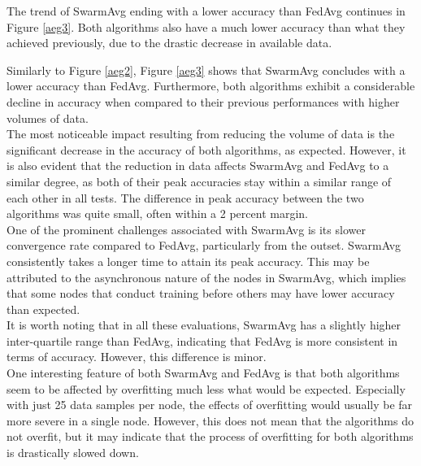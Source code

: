 The trend of SwarmAvg ending with a lower accuracy than FedAvg continues in Figure \ref{aeg3}. Both algorithms also have a much lower accuracy than what they achieved previously, due to the drastic decrease in available data.

Similarly to Figure \ref{aeg2}, Figure \ref{aeg3} shows that SwarmAvg concludes with a lower accuracy than FedAvg. Furthermore, both algorithms exhibit a considerable decline in accuracy when compared to their previous performances with higher volumes of data. \\


The most noticeable impact resulting from reducing the volume of data is the significant decrease in the accuracy of both algorithms, as expected. However, it is also evident that the reduction in data affects SwarmAvg and FedAvg to a similar degree, as both of their peak accuracies stay within a similar range of each other in all tests. The difference in peak accuracy between the two algorithms was quite small, often within a 2 percent margin. \\

One of the prominent challenges associated with SwarmAvg is its slower convergence rate compared to FedAvg, particularly from the outset. SwarmAvg consistently takes a longer time to attain its peak accuracy. This may be attributed to the asynchronous nature of the nodes in SwarmAvg, which implies that some nodes that conduct training before others may have lower accuracy than expected. \\

It is worth noting that in all these evaluations, SwarmAvg has a slightly higher inter-quartile range than FedAvg, indicating that FedAvg is more consistent in terms of accuracy. However, this difference is minor. \\

One interesting feature of both SwarmAvg and FedAvg is that both algorithms seem to be affected by overfitting much less what would be expected. Especially with just 25 data samples per node, the effects of overfitting would usually be far more severe in a single node. However, this does not mean that the algorithms do not overfit, but it may indicate that the process of overfitting for both algorithms is drastically slowed down.

